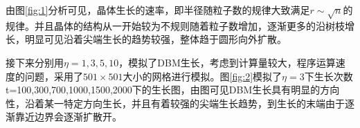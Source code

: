 \documentclass{article}
\begin{document}
由图\ref{fig:1}分析可见，晶体生长的速率，即半径随粒子数的规律大致满足$ r\sim\sqrt{n} $的规律。并且晶体的结构从一开始较为不规则随着粒子数增加，逐渐更多的沿树枝增长，明显可见沿着尖端生长的趋势较强，整体趋于圆形向外扩散。


接下来分别用$ \eta=1,3,5,10 $，模拟了DBM生长，考虑到计算量较大，程序运算速度的问题，采用了$ 501\times501 $大小的网格进行模拟。图\ref{fig:2}模拟了$ \eta=3 $下生长次数t=100,300,700,1000,1500,2000下的生长图，由图可见DBM生长具有明显的方向性，沿着某一特定方向生长，并且有着较强的尖端生长趋势，到生长的末端由于逐渐靠近边界会逐渐扩散开。
 \begin{figure}[!h]
	\centering
	

\end{figure}
\end{document}
